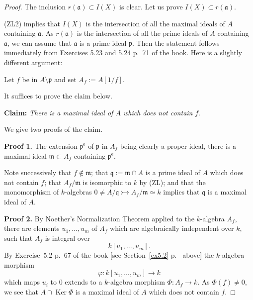 \documentclass[12pt,letterpaper]{article}%
\newcommand{\oo}{\operatorname}\newcommand{\ooo}{\operatorname*}
\newcommand{\mf}{\mathfrak}
\newcommand{\aaa}{\mf a}
\newcommand{\mmm}{\mf m}
\newcommand{\ppp}{\mf p}
\newcommand{\qqq}{\mf q}
\newcommand{\mono}{\rightarrowtail}
\newcommand{\nn}{\noindent}
\begin{document}
\begin{proof} 
The inclusion $r(\aaa)\subset I(X)$ is clear. Let us prove $I(X)\subset r(\aaa)$. 

(ZL2) implies that $I(X)$ is the intersection of all the maximal ideals of $A$ containing $\aaa$. As $r(\aaa)$ is the intersection of all the prime ideals of $A$ containing $\aaa$, we can assume that $\aaa$ is a prime ideal $\ppp$. Then the statement follows immediately from Exercises 5.23 and 5.24 p.~71 of the book. Here is a slightly different argument:

Let $f$ be in $A\setminus\ppp$ and set $A_f:=A[1/f]$.

It suffices to prove the claim below.

\nn\textbf{Claim:} \emph{There is a maximal ideal of $A$ which does not contain} $f$. 

We give two proofs of the claim.

\nn\textbf{Proof 1.} The extension $\ppp^{\oo e}$ of $\ppp$ in $A_f$ being clearly a proper ideal, there is a maximal ideal $\mmm\subset A_f$ containing $\ppp^{\oo e}$. 

Note successively that $f\notin\mmm$; that $\qqq:=\mmm\cap A$ is a prime ideal of $A$ which does not contain $f$; that $A_f/\mmm$ is isomorphic to $k$ by (ZL); and that the monomorphism of $k$-algebras $0\ne A/\qqq\mono A_f/\mmm\simeq k$ implies that $\qqq$ is a maximal ideal of $A$.

\nn\textbf{Proof 2.} By Noether's Normalization Theorem applied to the $k$-algebra $A_f$, there are elements $u_1,\dots,u_m$ of $A_f$ which are algebraically independent over $k$, such that $A_f$ is integral over 
$$
k[u_1,\dots,u_m].
$$ 
By Exercise~5.2 p.~67 of the book [see Section~\ref{ex5.2} p.~\pageref{ex5.2} above] the $k$-algebra morphism 
$$
\varphi:k[u_1,\dots,u_m]\to k
$$ 
which maps $u_i$ to $0$ extends to a $k$-algebra morphism $\Phi:A_f\to k$. As $\Phi(f)\ne0$, we see that $A\cap\oo{Ker}\Phi$ is a maximal ideal of $A$ which does not contain $f$.
\end{proof}%
\end{document}
